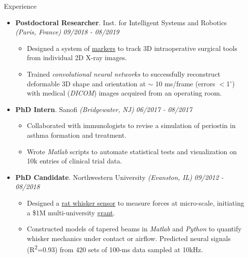\documentclass{resume} %
\begin{document}
\begin{rSection}{Experience}
\begin{itemize}[leftmargin=0em]
			\item {\bf Postdoctoral Researcher}{. Inst. for Intelligent Systems and Robotics \textit{(Paris, France)}} \hfill {\em 09/2018 - 08/2019}\\
			\vspace{-5mm}
			\begin{itemize}
				\setlength\itemsep{-1.75em}
				\item  Designed a system of \href{https://tinyurl.com/yxk4jou4}{markers} to track 3D intraoperative surgical tools from individual 2D X-ray images.\\ 
				\item  Trained \textit{convolutional neural networks} to successfully reconstruct deformable 3D shape and orientation at $\sim$ 10 ms/frame (errors $<$1$^\circ$) with medical (\textit{DICOM}) images acquired from an operating room.
			\end{itemize}
			
			\item {\bf PhD Intern}{. Sanofi \textit{(Bridgewater, NJ)}} \hfill {\em 06/2017 - 08/2017}\\
			\vspace{-5mm}
			\begin{itemize}
				\setlength\itemsep{-1.75em}	
				\item Collaborated with immunologists to revise a simulation of periostin in asthma formation and treatment.\\
				\item Wrote \textit{Matlab} scripts to automate statistical tests and visualization on 10k entries of clinical trial data.
			\end{itemize}
			
			\item {\bf PhD Candidate}{. Northwestern University \textit{(Evanston, IL)}} \hfill {\em 09/2012 - 08/2018}\\
			\vspace{-5mm}
			\begin{itemize}
				\setlength\itemsep{-1.75em}
				\item Designed a \href{https://www.youtube.com/watch?v=EPuThXPd-qw}{rat whisker sensor} to measure forces at micro-scale, initiating a \$1M multi-university \href{https://www.nsf.gov/news/mmg/mmg_disp.jsp?med_id=132588}{grant}.\\
				\item Constructed models of tapered beams in \textit{Matlab} and \textit{Python} to quantify whisker mechanics under contact or airflow. Predicted neural signals (R\textsuperscript{2}=0.93) from 420 sets of 100-ms data sampled at 10kHz.\\
			\end{itemize}
			
			
		\end{itemize}
		
	\end{rSection}
	
\end{document}

